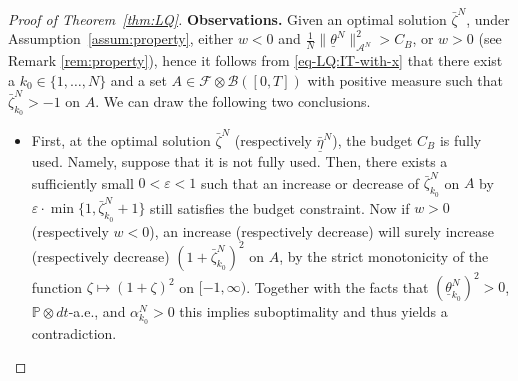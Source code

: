 \documentclass[11pt]{article}
\def\al{\alpha}
\def\P{\mathbb{P}}
\numberwithin{equation}{section}
\begin{document}
\begin{proof}[Proof of Theorem~\ref{thm:LQ}]
\textbf{Observations.} Given an optimal solution $\bar{\zeta}^N$, under Assumption~\ref{assum:property}, either $w<0$ and $\frac{1}{N}\|\underline{\theta}^N\|_{\mathcal{A}^N}^2> C_B$, or $w>0$ (see Remark \ref{rem:property}), hence it follows from \eqref{eq-LQ:IT-with-x} that there exist a $k_0\in\{1,\ldots,N\}$  and a set $A\in\mathcal{F}\otimes\mathcal{B}([0,T])$ with positive measure such that $\bar\zeta^N_{k_0}>-1$ on $A$. 
We can draw the following two conclusions.
\begin{itemize}
\item First, at the optimal solution $\bar\zeta^N$ (respectively $\underline{\bar{\eta}}^N$), the budget $C_B$ is fully used. Namely, suppose that it is not fully used. Then,  there exists a sufficiently small $0<\varepsilon<1$ such that an increase or decrease of $\bar\zeta^N_{k_0}$ on $A$ by $\varepsilon \cdot\min\{1,\bar\zeta^N_{k_0}+1\}$ still satisfies the budget constraint. Now if $w>0$ (respectively $w<0$), an increase (respectively decrease) will surely increase (respectively decrease) $(1+\bar\zeta^N_{k_0})^2$ on $A$, by the strict monotonicity of the function $\zeta\mapsto (1+\zeta)^2$ on $[-1,\infty)$.  Together with the facts that $(\underline{\theta}^N_{k_0})^2>0$, $\P\otimes dt$-a.e., and $\al^N_{k_0}>0$ this implies suboptimality and thus yields a contradiction.


\end{itemize}
\end{proof}
\end{document}
